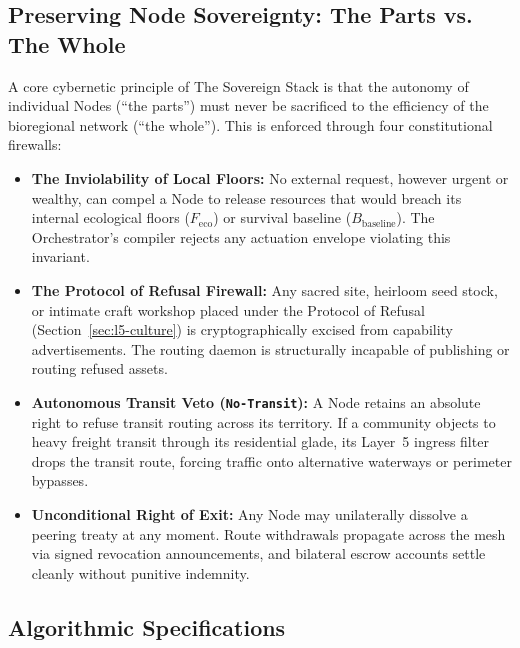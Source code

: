 \subsection{Preserving Node Sovereignty: The Parts vs. The Whole}

A core cybernetic principle of The Sovereign Stack is that the autonomy of individual Nodes (``the parts'') must never be sacrificed to the efficiency of the bioregional network (``the whole''). This is enforced through four constitutional firewalls:
\begin{itemize}
  \item \textbf{The Inviolability of Local Floors:} No external request, however urgent or wealthy, can compel a Node to release resources that would breach its internal ecological floors ($F_{\mathrm{eco}}$) or survival baseline ($B_{\mathrm{baseline}}$). The Orchestrator's compiler rejects any actuation envelope violating this invariant.
  \item \textbf{The Protocol of Refusal Firewall:} Any sacred site, heirloom seed stock, or intimate craft workshop placed under the Protocol of Refusal (Section~\ref{sec:l5-culture}) is cryptographically excised from capability advertisements. The routing daemon is structurally incapable of publishing or routing refused assets.
  \item \textbf{Autonomous Transit Veto (\texttt{No-Transit}):} A Node retains an absolute right to refuse transit routing across its territory. If a community objects to heavy freight transit through its residential glade, its Layer~5 ingress filter drops the transit route, forcing traffic onto alternative waterways or perimeter bypasses.
  \item \textbf{Unconditional Right of Exit:} Any Node may unilaterally dissolve a peering treaty at any moment. Route withdrawals propagate across the mesh via signed revocation announcements, and bilateral escrow accounts settle cleanly without punitive indemnity.
\end{itemize}

\subsection{Algorithmic Specifications}

